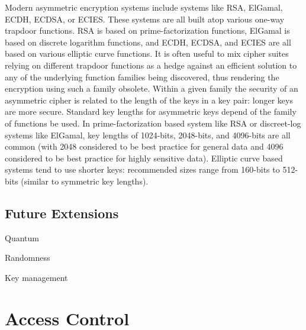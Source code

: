\documentclass{sig-alternate}
\begin{document}
Modern asymmetric encryption systems include systems like RSA,
ElGamal, ECDH, ECDSA, or ECIES. These systems are all built atop
various one-way trapdoor functions. RSA is based on
prime-factorization functions, ElGamal is based on discrete logarithm
functions, and ECDH, ECDSA, and ECIES are all based on various
elliptic curve functions. It is often useful to mix cipher suites
relying on different trapdoor functions as a hedge against an
efficient solution to any of the underlying function families being
discovered, thus rendering the encryption using such a family
obsolete. Within a given family the security of an asymmetric cipher
is related to the length of the keys in a key pair: longer keys are
more secure. Standard key lengths for asymmetric keys depend of the
family of functions be used. In prime-factorization based system like
RSA or discreet-log systems like ElGamal, key lengths of 1024-bits,
2048-bits, and 4096-bits are all common (with 2048 considered to be
best practice for general data and 4096 considered to be best practice
for highly sensitive data). Elliptic curve based systems tend to use
shorter keys: recommended sizes range from 160-bits to 512-bits
(similar to symmetric key lengths).

\subsection{Future Extensions}

Quantum

Randomness

Key management

\section{Access Control}
\label{sec:ac}

\end{document}
